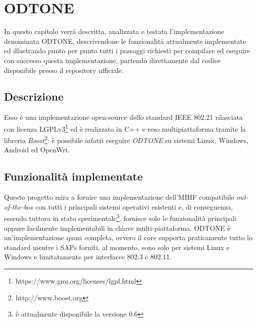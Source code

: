 \chapter{ODTONE}

In questo capitolo verrà descritta, analizzata e testata l'implementazione denominata ODTONE, descrivendone le funzionalità attualmente implementate ed illustrando punto per punto tutti i passaggi richiesti per compilare ed eseguire con successo questa implementazione, partendo direttamente dal codice disponibile presso il repository ufficiale.

\section{Descrizione}
Esso è una implementazione open-source dello standard IEEE 802.21 rilasciata con licenza LGPLv3\footnote{https://www.gnu.org/licenses/lgpl.html} ed è realizzato in C++ e reso multipiattaforma tramite la libreria {\em Boost}\footnote{http://www.boost.org}: è possibile infatti eseguire {\em ODTONE} su sistemi Linux, Windows, Android ed OpenWrt.

\section{Funzionalità implementate}

Questo progetto mira a fornire una implementazione dell'MIHF compatibile {\em out-of-the-box} con tutti i principali sistemi operativi esistenti e, di conseguenza, essendo tuttora in stato sperimentale\footnote{è attualmente disponibile la versione 0.6}, fornisce solo le funzionalità principali oppure facilmente implementabili in chiave multi-piattaforma. ODTONE è un'implementazione quasi completa, ovvero il core supporta praticamente tutto lo standard mentre i SAPs forniti, al momento, sono solo per sistemi Linux e Windows e limitatamente per interfacce 802.3 e 802.11.

